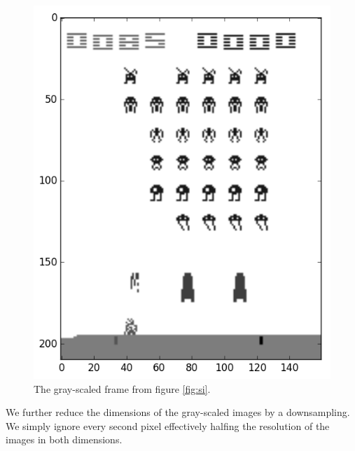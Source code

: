 \documentclass[11pt]{article}
\begin{document}
\begin{figure}[!h]
    \centering
    \includegraphics[scale=0.35]{include/space_invaders_1_gray.png}
    \caption{The gray-scaled frame from figure \ref{fig:si}.}
    \label{fig:sig}
\end{figure}

We further reduce the dimensions of the gray-scaled images by a downsampling.
We simply ignore every second pixel effectively halfing the resolution of the images
in both dimensions.
\end{document}
